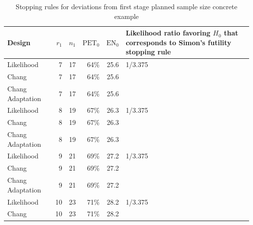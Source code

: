 \documentclass[12pt]{report}\usepackage[]{graphicx}\usepackage[]{color}
\newlength{\li}\setlength{\li}{14.48pt}
\begin{document}
\begin{table}[]
\centering
\caption{Stopping rules for deviations from first stage planned sample size concrete example}
\hspace*{-3.5cm}
\begin{tabular}{|L|R|R|R|R|L|}
\hline
Design           & $r_1$ & $n_1$ & $\mbox{PET}_0$ & $\mbox{EN}_0$ & Likelihood ratio favoring $H_0$ that corresponds to Simon's futility stopping rule \\ \hline
Likelihood       & 7     & 17    & 64\%           & 25.6          & 1/3.375                                                                            \\ \hline
Chang            & 7     & 17    & 64\%           & 25.6          &                                                                                    \\ \hline
Chang Adaptation & 7     & 17    & 64\%           & 25.6          &                                                                                    \\ \hline
Likelihood       & 8     & 19    & 67\%           & 26.3          & 1/3.375                                                                            \\ \hline
Chang            & 8     & 19    & 67\%           & 26.3          &                                                                                    \\ \hline
Chang Adaptation & 8     & 19    & 67\%           & 26.3          &                                                                                    \\ \hline
Likelihood       & 9     & 21    & 69\%           & 27.2          & 1/3.375                                                                            \\ \hline
Chang            & 9     & 21    & 69\%           & 27.2          &                                                                                    \\ \hline
Chang Adaptation & 9     & 21    & 69\%           & 27.2          &                                                                                    \\ \hline
Likelihood       & 10    & 23    & 71\%           & 28.2          & 1/3.375                                                                            \\ \hline
Chang            & 10    & 23    & 71\%           & 28.2          &                                                                                    \\ \hline

\end{tabular}
\end{table}
\end{document}
